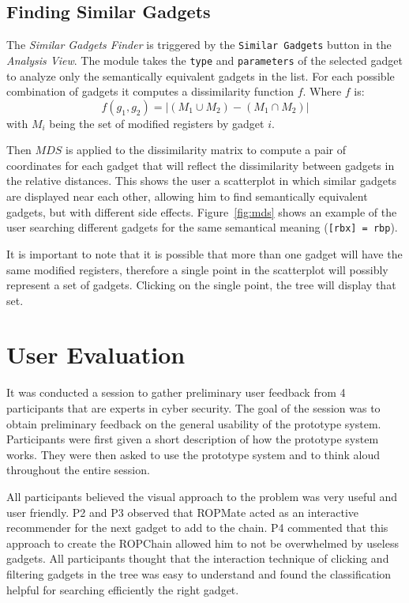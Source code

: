 \documentclass[twocolumn, 11pt]{article}
\begin{document}
\subsection{Finding Similar Gadgets}
The \textit{Similar Gadgets Finder} is triggered by the \texttt{Similar Gadgets} button in the \textit{Analysis View}. The module takes the \texttt{type} and \texttt{parameters} of the selected gadget to analyze only the semantically equivalent gadgets in the list. For each possible combination of gadgets it computes a dissimilarity function $f$. Where $f$ is:
$$
f(g_1, g_2) = |(M_1 \cup M_2) - (M_1 \cap M_2)|
$$
with $M_i$ being the set of modified registers by gadget $i$.

Then $MDS$ is applied to the dissimilarity matrix to compute a pair of coordinates for each gadget that will reflect the dissimilarity between gadgets in the relative distances. This shows the user a scatterplot in which similar gadgets are displayed near each other, allowing him to find semantically equivalent gadgets, but with different side effects. Figure~\ref{fig:mds} shows an example of the user searching different gadgets for the same semantical meaning (\texttt{[rbx] = rbp}).

It is important to note that it is possible that more than one gadget will have the same modified registers, therefore a single point in the scatterplot will possibly represent a set of gadgets. Clicking on the single point, the tree will display that set.

\section{User Evaluation}
It was conducted a session to gather preliminary user feedback from 4 participants that are experts in cyber security. The goal of the session was to obtain preliminary feedback on the general usability of the prototype system. Participants were first given a short description of how the prototype system works. They were then asked to use the prototype system and to think aloud throughout the entire session.

All participants believed the visual approach to the problem was very useful and user friendly. P2 and P3 observed that ROPMate acted as an interactive recommender for the next gadget to add to the chain. P4 commented that this approach to create the ROPChain allowed him to not be overwhelmed by useless gadgets. All participants thought that the interaction technique of clicking and filtering gadgets in the tree was easy to understand and found the classification helpful for searching efficiently the right gadget.
\end{document}

